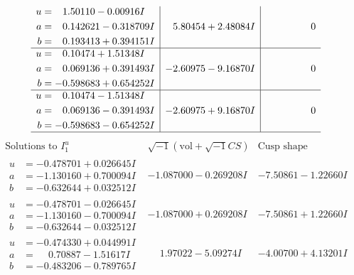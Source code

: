 \documentclass[1p]{elsarticle_modified}
\theoremstyle{definition}
\newcommand{\I}{\sqrt{-1}}
\begin{document}
$$\begin{array}{c|c|c}
\begin{aligned}
u &= \phantom{-}1.50110 - 0.00916 I \\
a &= \phantom{-}0.142621 - 0.318709 I \\
b &= \phantom{-}0.193413 + 0.394151 I\end{aligned}
 & \phantom{-}5.80454 + 2.48084 I & \phantom{-0.000000 } 0 \\ \hline\begin{aligned}
u &= \phantom{-}0.10474 + 1.51348 I \\
a &= \phantom{-}0.069136 + 0.391493 I \\
b &= -0.598683 + 0.654252 I\end{aligned}
 & -2.60975 - 9.16870 I & \phantom{-0.000000 } 0 \\ \hline\begin{aligned}
u &= \phantom{-}0.10474 - 1.51348 I \\
a &= \phantom{-}0.069136 - 0.391493 I \\
b &= -0.598683 - 0.654252 I\end{aligned}
 & -2.60975 + 9.16870 I & \phantom{-0.000000 } 0\\
 \hline 
 \end{array}$$\newpage$$\begin{array}{c|c|c}  
\text{Solutions to }I^u_{1}& \I (\text{vol} + \sqrt{-1}CS) & \text{Cusp shape}\\
 \hline 
\begin{aligned}
u &= -0.478701 + 0.026645 I \\
a &= -1.130160 + 0.700094 I \\
b &= -0.632644 + 0.032512 I\end{aligned}
 & -1.087000 - 0.269208 I & -7.50861 - 1.22660 I \\ \hline\begin{aligned}
u &= -0.478701 - 0.026645 I \\
a &= -1.130160 - 0.700094 I \\
b &= -0.632644 - 0.032512 I\end{aligned}
 & -1.087000 + 0.269208 I & -7.50861 + 1.22660 I \\ \hline\begin{aligned}
u &= -0.474330 + 0.044991 I \\
a &= \phantom{-}0.70887 - 1.51617 I \\
b &= -0.483206 - 0.789765 I\end{aligned}
 & \phantom{-}1.97022 - 5.09274 I & -4.00700 + 4.13201 I \\ \hline\begin{aligned}

\end{aligned}
\end{array}$$
\end{document}
